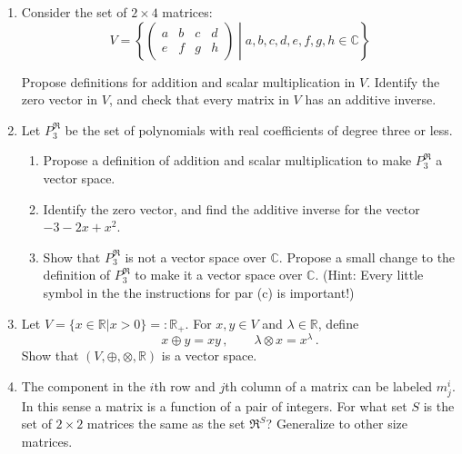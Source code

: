 \begin{enumerate}
\vspace{5mm}

\item Consider the set of $2\times 4$ matrices:
\[ V = \left\{ 
\begin{pmatrix}
a & b & c & d \\
e & f & g & h 
\end{pmatrix}
\middle| a,b,c,d,e,f,g,h \in \mathbb{C} \right\}
\]

Propose definitions for addition and scalar multiplication in $V$.  Identify the zero vector in $V$, and check that every matrix in $V$ has an additive inverse.  

\vspace{5mm}

\item \label{problem_polynomials} Let $P_3^{\Re}$ be the set of polynomials with real coefficients of degree three or less.
	\begin{enumerate}
	\item Propose a definition of addition and scalar multiplication to make $P_3^{\Re}$ a vector space.

	\item Identify the zero vector, and find the additive inverse for the vector $-3-2x+x^2$.

	\item Show that $P_3^{\Re}$ is not a vector space over $\mathbb{C}$.  Propose a small change to the definition of $P_3^{\Re}$ to make it a vector space over $\mathbb{C}$. (Hint: Every little symbol in the the instructions for par (c) is important!)
\end{enumerate}


\item Let $V=\{x\in {\mathbb R}|x>0\}=:{\mathbb R}_+$. For $x,y\in V$ and $\lambda\in {\mathbb R}$, define
$$
x\oplus y = xy\, ,\qquad \lambda \otimes x = x^\lambda\, .
$$
Show that $(V,\oplus,\otimes,{\mathbb R})$ is a vector space.

\item The component in the $i$th row and $j$th column of a matrix can be labeled $m^i_{j}$. In this sense a matrix is a function of a pair of integers. For what set $S$ is the set of  $2\times2$ matrices the same as the set $\Re^S$? Generalize to other size matrices. 


\end{enumerate}
